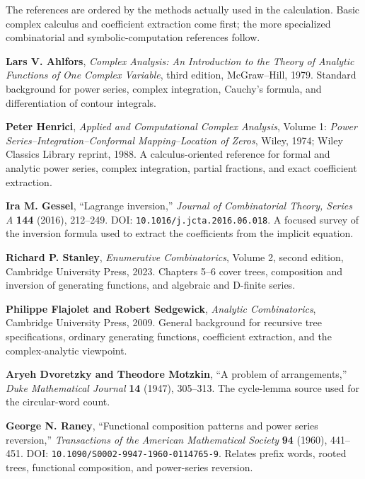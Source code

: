 \documentclass[11pt,fleqn]{article}
\theoremstyle{plain}
\begin{document}
The references are ordered by the methods actually used in the calculation.
Basic complex calculus and coefficient extraction come first; the more
specialized combinatorial and symbolic-computation references follow.
\begin{sloppypar}
\begin{enumerate}[label={[\arabic*]},leftmargin=2.4em,itemsep=0.52em]
\item \textbf{Lars V. Ahlfors}, \emph{Complex Analysis: An Introduction to
the Theory of Analytic Functions of One Complex Variable}, third edition,
McGraw--Hill, 1979. Standard background for power series, complex integration,
Cauchy's formula, and differentiation of contour integrals.

\item \textbf{Peter Henrici}, \emph{Applied and Computational Complex
Analysis}, Volume 1: \emph{Power Series--Integration--Conformal
Mapping--Location of Zeros}, Wiley, 1974; Wiley Classics Library reprint,
1988. A calculus-oriented reference for formal and analytic power series,
complex integration, partial fractions, and exact coefficient extraction.

\item \textbf{Ira M. Gessel}, ``Lagrange inversion,'' \emph{Journal of
Combinatorial Theory, Series A} \textbf{144} (2016), 212--249. DOI:
\nolinkurl{10.1016/j.jcta.2016.06.018}. A focused survey of the inversion
formula used to extract the coefficients from the implicit equation.

\item \textbf{Richard P. Stanley}, \emph{Enumerative Combinatorics},
Volume 2, second edition, Cambridge University Press, 2023. Chapters 5--6
cover trees, composition and inversion of generating functions, and algebraic
and D-finite series.

\item \textbf{Philippe Flajolet and Robert Sedgewick}, \emph{Analytic
Combinatorics}, Cambridge University Press, 2009. General background for
recursive tree specifications, ordinary generating functions, coefficient
extraction, and the complex-analytic viewpoint.

\item \textbf{Aryeh Dvoretzky and Theodore Motzkin}, ``A problem of
arrangements,'' \emph{Duke Mathematical Journal} \textbf{14} (1947),
305--313. The cycle-lemma source used for the circular-word count.

\item \textbf{George N. Raney}, ``Functional composition patterns and power
series reversion,'' \emph{Transactions of the American Mathematical Society}
\textbf{94} (1960), 441--451. DOI:
\nolinkurl{10.1090/S0002-9947-1960-0114765-9}. Relates prefix words, rooted
trees, functional composition, and power-series reversion.


\end{enumerate}
\end{sloppypar}
\end{document}
